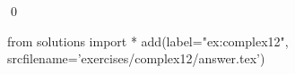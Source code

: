 
\begin{ex} 
  \label{ex:complex12}
  
  \qed
\end{ex} 
\begin{python0}
from solutions import *
add(label="ex:complex12",
    srcfilename='exercises/complex12/answer.tex') 
\end{python0}
